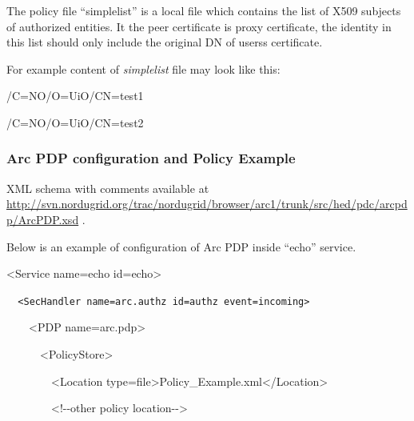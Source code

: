 \documentclass[a4paper]{article}
\begin{document}
{\upshape\color{black}
The policy file {\textquotedblleft}simplelist{\textquotedblright} is a
local file which contains the list of X509 subjects of authorized
entities. It the peer certificate is proxy certificate, the identity in
this list should only include the original DN of
users{\textquotesingle}s certificate.}

{\upshape\color{black}
For example content of \textit{simplelist} file may look like this:}

{\color{black}
/C=NO/O=UiO/CN=test1}

{\color{black}
/C=NO/O=UiO/CN=test2}

\subsubsection[Arc PDP configuration and Policy Example]{Arc PDP
configuration and Policy Example}
\label{bkm:Ref204009974}{\upshape\color{black}
XML schema with comments available at
\url{http://svn.nordugrid.org/trac/nordugrid/browser/arc1/trunk/src/hed/pdc/arcpdp/ArcPDP.xsd}
.}

{\upshape\color{black}
Below is an example of configuration of Arc PDP inside
{\textquotedblleft}echo{\textquotedblright} service.}

{\ttfamily\color{black}
{\textless}Service name={\textquotedbl}echo{\textquotedbl}
id={\textquotedbl}echo{\textquotedbl}{\textgreater}}

{\upshape\color{black}
\foreignlanguage{spanish}{\texttt{\ \ }}\texttt{{\textless}SecHandler
name={\textquotedbl}arc.authz{\textquotedbl}
id={\textquotedbl}authz{\textquotedbl}
event={\textquotedbl}incoming{\textquotedbl}{\textgreater}}}

{\ttfamily\color{black}
\ \ \ \ {\textless}PDP
name={\textquotedbl}arc.pdp{\textquotedbl}{\textgreater}}

{\ttfamily\color{black}
\ \ \ \ \ \ {\textless}PolicyStore{\textgreater}}

{\ttfamily\color{black}
\ \ \ \ \ \ \ \ {\textless}Location
type={\textquotedbl}file{\textquotedbl}{\textgreater}Policy\_Example.xml{\textless}/Location{\textgreater}}

{\ttfamily\color{black}
\ \ \ \ \ \ \ \ {\textless}!-{}-other policy location-{}-{\textgreater}}
\end{document}
